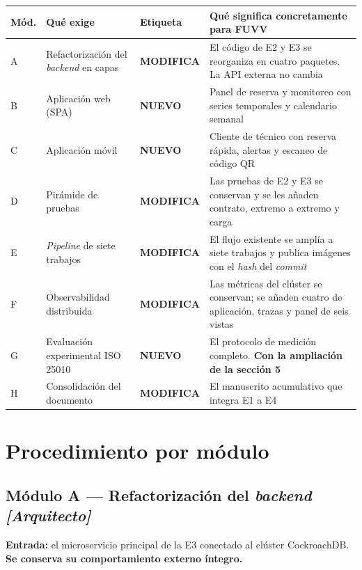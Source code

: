 \documentclass[11pt,a4paper]{article}
\newcommand{\cambia}{\cellcolor{filaCambia}\textbf{MODIFICA}}
\newcommand{\nuevo}{\cellcolor{filaNuevo}\textbf{NUEVO}}
\begin{document}
\begin{center}
	\footnotesize
	\begin{longtable}{@{}p{1.0cm}p{3.5cm}p{1.6cm}p{9.0cm}@{}}
		\toprule
		\textbf{Mód.} & \textbf{Qué exige} & \textbf{Etiqueta} & \textbf{Qué significa concretamente para FUVV} \\
		\midrule
		\endhead
		A & Refactorización del \emph{backend} en capas & \cambia & El código de E2 y E3 se reorganiza en cuatro paquetes. La API externa no cambia \\
		\addlinespace
		B & Aplicación web (SPA) & \nuevo & Panel de reserva y monitoreo con series temporales y calendario semanal \\
		\addlinespace
		C & Aplicación móvil & \nuevo & Cliente de técnico con reserva rápida, alertas y escaneo de código QR \\
		\addlinespace
		D & Pirámide de pruebas & \cambia & Las pruebas de E2 y E3 se conservan y se les añaden contrato, extremo a extremo y carga \\
		\addlinespace
		E & \emph{Pipeline} de siete trabajos & \cambia & El flujo existente se amplía a siete trabajos y publica imágenes con el \emph{hash} del \emph{commit} \\
		\addlinespace
		F & Observabilidad distribuida & \cambia & Las métricas del clúster se conservan; se añaden cuatro de aplicación, trazas y panel de seis vistas \\
		\addlinespace
		G & Evaluación experimental ISO 25010 & \nuevo & El protocolo de medición completo. \textbf{Con la ampliación de la sección 5} \\
		\addlinespace
		H & Consolidación del documento & \cambia & El manuscrito acumulativo que integra E1 a E4 \\
		\bottomrule
	\end{longtable}
\end{center}

\section{Procedimiento por módulo}

\subsection{Módulo A --- Refactorización del \emph{backend} \emph{[Arquitecto]}}

\textbf{Entrada:} el microservicio principal de la E3 conectado al clúster CockroachDB. \textbf{Se conserva su comportamiento externo íntegro.}
\end{document}
